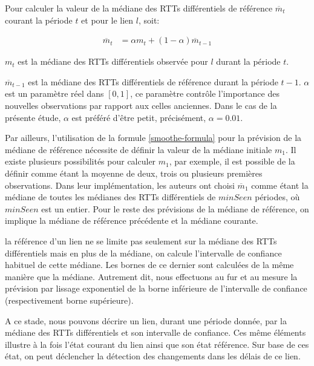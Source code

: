 Pour calculer la  valeur de la médiane des RTTs différentiels de référence $ \overline{m}_{t}$   courant la période $ t $ et pour le lien $l$, soit:

\begin{align}
\overline{m}_{t}& =  \alpha {m}_{t} + (1-  \alpha) \overline{m}_{t-1} \label{smoothe-formula}
\end{align} 

$m_t$ est la médiane des RTTs différentiels observée pour $l$ durant la période $t$. 

$ \overline{m}_{t-1}$  est la médiane des  RTTs différentiels  de référence durant la période $ t-1 $.  
$\alpha$ est un paramètre réel dans $[0,1]$, ce paramètre contrôle l'importance des nouvelles observations par rapport aux celles anciennes. Dans le cas de la présente étude, $\alpha$ est préféré d'être petit, précisément, $ \alpha = 0.01$.

Par ailleurs, l'utilisation de la formule \ref{smoothe-formula} pour la prévision de la médiane de référence nécessite de définir la valeur de la médiane initiale $ {m}_{1}$. Il existe plusieurs possibilités pour calculer $ {m}_{1}$, par exemple, il est possible de la définir comme étant la moyenne de deux, trois ou plusieurs premières observations. Dans leur implémentation, les auteurs ont choisi $\overline{m}_{1}$ comme étant la médiane de toutes les médianes des RTTs différentiels de $minSeen$  périodes, où $minSeen$ est un entier. Pour le reste des prévisions de la médiane de référence, on implique la médiane de référence précédente et  la médiane courante.

la référence d'un lien ne se limite pas seulement sur la médiane des RTTs différentiels mais en plus de la médiane,  on calcule  l'intervalle de confiance habituel de cette médiane. Les bornes de ce dernier sont calculées de la même manière que la médiane. Autrement dit, nous effectuons au fur et au mesure la prévision par lissage exponentiel de la borne inférieure de l'intervalle de confiance (respectivement borne supérieure). 

A ce stade, nous pouvons décrire un lien, durant une période donnée, par la médiane des RTTs différentiels et son intervalle de confiance. Ces même éléments illustre à la fois l'état courant du lien ainsi que son état référence. Sur base de ces état, on peut déclencher la détection des changements dans les délais de ce lien.

